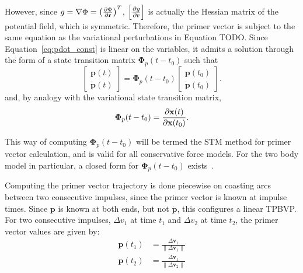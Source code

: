 However, since \(g = \nabla \Phi = \left(\frac{\partial \Phi}{\partial \mathbf{r}}\right)^T\), \(\left[\frac{\partial g}{\partial \mathbf{r}}\right]\) is actually the Hessian matrix of the potential field, which is symmetric. Therefore, the primer vector is subject to the same equation as the variational perturbations in Equation TODO\@. Since Equation~\eqref{eq:pdot_const} is linear on the variables, it admits a solution through the form of a state transition matrix \(\mathbf{\Phi}_p(t - t_0)\) such that
\begin{equation}
    \begin{bmatrix}
        \mathbf{p}(t) \\ \dot{\mathbf{p}}(t)
    \end{bmatrix} = \mathbf{\Phi}_p(t - t_0) \begin{bmatrix}
        \mathbf{p}(t_0) \\ \dot{\mathbf{p}}(t_0)
    \end{bmatrix}.
\end{equation}
and, by analogy with the variational state transition matrix, 
\begin{equation}
    \mathbf{\Phi}_p(t - t_0) = \frac{\partial \mathbf{x}(t)}{\partial \mathbf{x}(t_0)}.
\end{equation}

This way of computing \(\mathbf{\Phi}_p(t - t_0)\) will be termed the STM method for primer vector calculation, and is valid for all conservative force models. For the two body model in particular, a closed form for \(\mathbf{\Phi}_p(t-t_0)\) exists~\cite{glandorf_transition_matrix}. 

Computing the primer vector trajectory is done piecewise on coasting arcs between two consecutive impulses, since the primer vector is known at impulse times. Since \(\mathbf{p}\) is known at both ends, but not \(\dot{\mathbf{p}}\), this configures a linear TPBVP\@. For two consecutive impulses, \(\Delta v_1\) at time \(t_1\) and \(\Delta v_2\) at time \(t_2\), the primer vector values are given by:
\begin{align}
    \mathbf{p}(t_1) &= \frac{\Delta \mathbf{v}_1}{\lVert \Delta \mathbf{v}_1 \rVert} \\
    \mathbf{p}(t_2) &= \frac{\Delta \mathbf{v}_1}{\lVert \Delta \mathbf{v}_2 \rVert}
\end{align}

